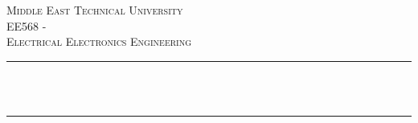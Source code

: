 \begin{titlepage}
  	\newcommand{\HRule}{\rule{\linewidth}{0.3mm}} %
	\center %
	
	\textsc{\LARGE Middle East Technical University}\\[1.5cm]
	
	\textsc{\Large EE568 - \deliverableName}\\[0.5cm]
	
	\textsc{\large Electrical Electronics Engineering}\\[0.5cm]
	
	
	\HRule\\[0.4cm]
	
	{\huge\bfseries \@title}\\[0.4cm]
	
	\HRule\\[1.5cm]
	
	\begin{minipage}{0.4\textwidth}
		\begin{flushleft}
			\large
			\textit{}\\
			\@author %
		\end{flushleft}
	\end{minipage}
	~
	\begin{minipage}{0.4\textwidth}
		\begin{flushright}
			\large
			\textit{}
		\end{flushright}
	\end{minipage}
	
	
	
	\vfill\vfill
		{\large\@date} %
    \vfill\vfill\vfill
	

\end{titlepage}
